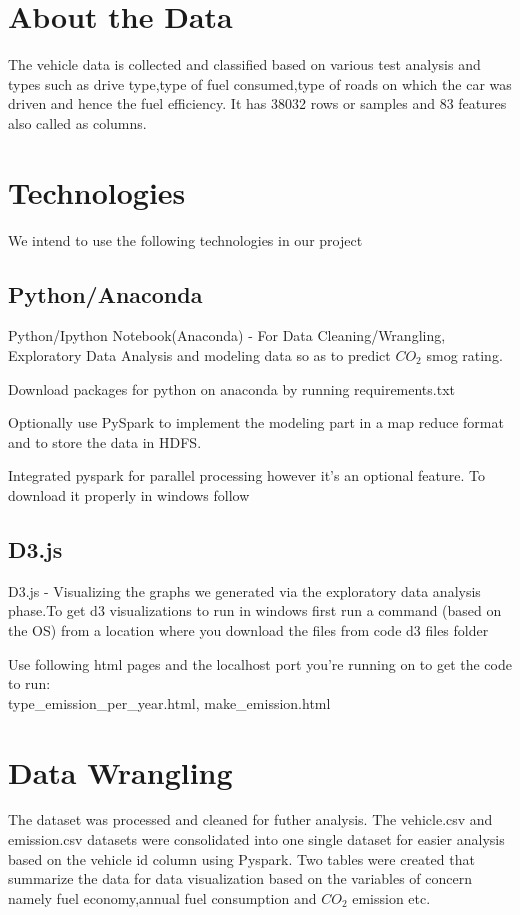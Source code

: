 \documentclass{acm_proc_article-sp}
\begin{document}
\section{About the Data}
The vehicle data is collected and classified based on various test analysis and types such as drive type,type of fuel consumed,type of roads on which the car was driven and hence the fuel efficiency. It has 38032 rows or samples and 83 features also called as columns.

\section{Technologies}
We intend to use the following technologies in our project
\subsection{Python/Anaconda}
Python/Ipython Notebook(Anaconda) - For Data Cleaning/Wrangling, Exploratory Data Analysis and modeling data so as to predict $CO_{2}$ smog rating.

Download packages for python on anaconda by running requirements.txt

Optionally use PySpark to implement the modeling part in a map reduce format and to store the data in HDFS.\

Integrated pyspark for parallel processing however it's an optional feature. To download it properly in windows follow \cite{Kadamati2015}

\subsection{D3.js}
D3.js - Visualizing the graphs we generated via the exploratory data analysis phase.To get d3 visualizations to run in windows first run a command (based on the OS)
from a location where you download the files from code d3 files folder 

Use following html pages and the localhost port you're running on to get the code to run:\\
type\_emission\_per\_year.html, 
make\_emission.html

\section{Data Wrangling}
The dataset was processed and cleaned for futher analysis. The vehicle.csv and emission.csv datasets were consolidated into one single dataset for easier analysis based on the vehicle id column using Pyspark.
Two tables were created that summarize the data for data visualization based on the variables of concern namely fuel economy,annual fuel consumption and $CO_{2}$ emission etc.
\end{document}
